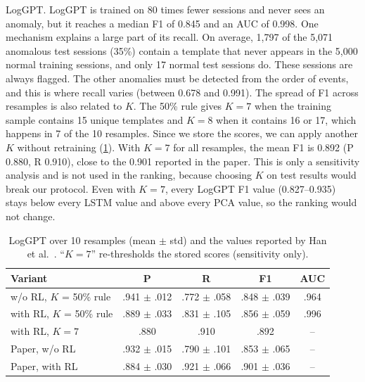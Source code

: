 \documentclass[10pt, conference]{IEEEtran}
\renewcommand{\paragraph}[1]{\noindent\textsf{#1}.}
\begin{document}
\paragraph{LogGPT} LogGPT is trained on 80 times fewer sessions and never sees an anomaly, but it reaches a median F1 of 0.845 and an AUC of 0.998. One mechanism explains a large part of its recall. On average, 1,797 of the 5,071 anomalous test sessions (35\%) contain a template that never appears in the 5,000 normal training sessions, and only 17 normal test sessions do. These sessions are always flagged. The other anomalies must be detected from the order of events, and this is where recall varies (between 0.678 and 0.991). The spread of F1 across resamples is also related to $K$. The 50\% rule gives $K=7$ when the training sample contains 15 unique templates and $K=8$ when it contains 16 or 17, which happens in 7 of the 10 resamples. Since we store the scores, we can apply another $K$ without retraining (\cref{tab:loggpt}). With $K=7$ for all resamples, the mean F1 is 0.892 (P 0.880, R 0.910), close to the 0.901 reported in the paper. This is only a sensitivity analysis and is not used in the ranking, because choosing $K$ on test results would break our protocol. Even with $K=7$, every LogGPT F1 value (0.827--0.935) stays below every LSTM value and above every PCA value, so the ranking would not change.

\begin{table}[t]
\centering
\caption{LogGPT over 10 resamples (mean $\pm$ std) and the values reported by Han et al.~\cite{han2023loggpt}. ``$K=7$'' re-thresholds the stored scores (sensitivity only).}
\label{tab:loggpt}
\footnotesize
\setlength{\tabcolsep}{2pt}
\begin{tabular}{lcccc}
\toprule
Variant & P & R & F1 & AUC \\
\midrule
w/o RL, $K$ = 50\% rule & .941 $\pm$ .012 & .772 $\pm$ .058 & .848 $\pm$ .039 & .964 \\
with RL, $K$ = 50\% rule & .889 $\pm$ .033 & .831 $\pm$ .105 & .856 $\pm$ .059 & .996 \\
with RL, $K=7$ & .880 & .910 & .892 & -- \\
\midrule
Paper, w/o RL & .932 $\pm$ .015 & .790 $\pm$ .101 & .853 $\pm$ .065 & -- \\
Paper, with RL & .884 $\pm$ .030 & .921 $\pm$ .066 & .901 $\pm$ .036 & -- \\
\bottomrule
\end{tabular}
\end{table}
\end{document}
